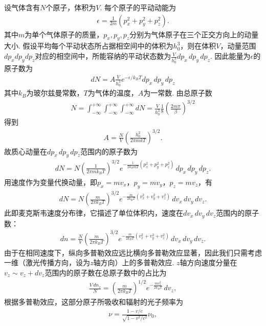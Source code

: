 \documentclass[a4paper, 10pt]{article}
\begin{document}
\begin{multicols}{2}
设气体含有$N$个原子，体积为$V$. 每个原子的平动动能为
\begin{align}
    \epsilon=\frac{1}{2m}(p_x^2+p_y^2+p_z^2).
\end{align}
其中$m$为单个气体原子的质量，$p_x,p_y,p_z$分别为气体原子在三个正交方向上的动量大小.
假设平均每个平动状态所占据相空间中的体积为$h_0^3$，则在体积$V$，动量范围$dp_xdp_ydp_z$对应的相空间中，所能容纳的平动状态数为$\frac{V}{h_0^3}dp_x\,dp_y\,dp_z$.
因此能量为$\epsilon$的原子数为
\begin{align}
    dN=A\frac{V}{h_0^3}e^{-\epsilon/k_BT}dp_x\,dp_y\,dp_z
\end{align}
其中$k_B$为玻尔兹曼常数，$T$为气体的温度，$A$为一常数.
由总原子数
\begin{align}
    N=\int_{-\infty}^{+\infty}\int_{-\infty}^{+\infty}\int_{-\infty}^{+\infty}dN=\frac{V}{h_0^3}\frac{1}{8}\left(\frac{2m\pi}{\beta}\right)^{3/2}
\end{align}
得到
\begin{align}
    A=\frac{N}{V}\left(\frac{h_0^2}{2\pi mkT}\right)^{3/2}.
\end{align}
故质心动量在$dp_x\,dp_y\,dp_z$范围内的原子数为
\begin{align}
    dN=N\left(\frac{1}{2\pi mk_BT}\right)^{3/2}e^{-\frac{1}{2k_BmT}\left(p_x^2+p_y^2+p_z^2\right)}\,dp_x\,dp_y\,dp_z.
\end{align}
用速度作为变量代换动量，即$p_x=mv_x$，$p_y=mv_y$，$p_z=mv_z$，有
\begin{align}
    dN=N\left(\frac{m}{2\pi k_BT}\right)^{3/2}e^{-\frac{m}{2k_BT}\left(v_x^2+v_y^2+v_z^2\right)}\,dv_x\,dv_y\,dv_z.
\end{align}
此即麦克斯韦速度分布律，它描述了单位体积内，速度在$dv_x\,dv_y\,dv_z$范围内的原子数：
\begin{align}
    dn=\frac{N}{V}\left(\frac{m}{2\pi k_BT}\right)^{3/2}e^{-\frac{m}{2k_BT}\left(v_x^2+v_y^2+v_z^2\right)}\,dv_x\,dv_y\,dv_z.
\end{align}
由于在相同速度下，纵向多普勒效应远比横向多普勒效应显著，因此我们只需考虑一维（激光传播方向，设为$z$轴方向）上的多普勒效应. $z$轴方向速度分量在$v_z\sim v_z+dv_z$范围内的原子数在总原子数中的占比为
\begin{align}
    \frac{V\,dn_z}{N}=\left(\frac{m}{2\pi k_BT}\right)^{1/2}e^{-\frac{mv_z^2}{2k_BT}}\,dv_z,
\end{align}
根据多普勒效应，这部分原子所吸收和辐射的光子频率为
\begin{align}
    \nu=\frac{1-v/c}{\sqrt{1-v^2/c^2}}\nu_0,
\end{align}

\end{multicols}
\end{document}
